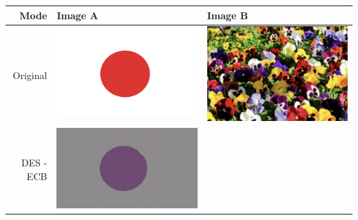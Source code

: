 \documentclass[fleqn, journal, onecolumn]{IEEEtran}             %
\theoremstyle{break}                                            %
\begin{document}
   \begin{tabular}{|r || p{5cm} | p{5cm} | }
    \hline
    Mode & Image A & Image B  \\ [0.5ex] 
    \hline\hline
   
      Original  &  
        \begin{minipage}{.2\textwidth}
          \includegraphics[width=\linewidth]{japan}
        \end{minipage}  & 
        \begin{minipage}{.2\textwidth}
          \includegraphics[width=\linewidth]{flores}
        \end{minipage}
        \\\hline
      DES - ECB  &  
      \begin{minipage}{.2\textwidth}
        \includegraphics[width=\linewidth]{1DES1}

\end{minipage}
\end{tabular}
\end{document}

